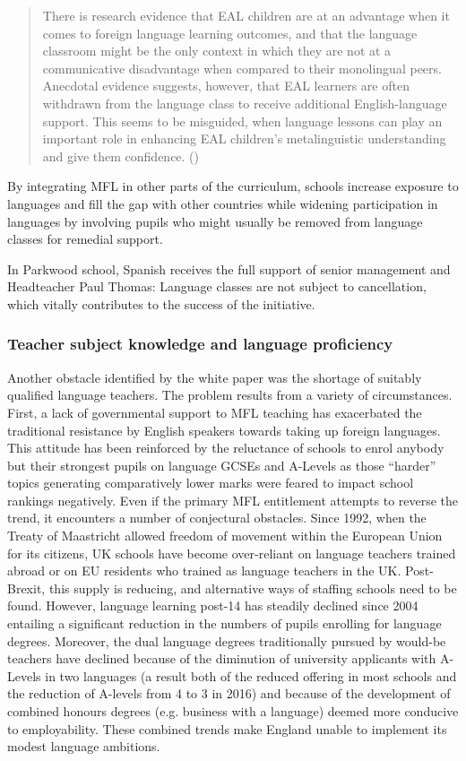 \documentclass[output=paper]{langscibook}
\begin{document}
\begin{quote}
There is research evidence that EAL children are at an advantage when it comes to foreign language learning outcomes, and that the language classroom might be the only context in which they are not at a communicative disadvantage when compared to their monolingual peers. Anecdotal evidence suggests, however, that EAL learners are often withdrawn from the language class to receive additional English-language support. This seems to be misguided, when language lessons can play an important role in enhancing EAL children’s metalinguistic understanding and give them confidence. (\citealt[11--12]{HolmesMyles2019})
\end{quote}

By integrating MFL in other parts of the curriculum, schools increase exposure to languages and fill the gap with other countries while widening participation in languages by involving pupils who might usually be removed from language classes for remedial support.

In Parkwood school, Spanish receives the full support of senior management and Headteacher Paul Thomas: Language classes are not subject to cancellation, which vitally contributes to the success of the initiative.

\subsubsection{Teacher subject knowledge and language proficiency}

Another obstacle identified by the white paper was the shortage of suitably qualified language teachers. The problem results from a variety of circumstances. First, a lack of governmental support to MFL teaching has exacerbated the traditional resistance by English speakers towards taking up foreign languages. This attitude has been reinforced by the reluctance of schools to enrol anybody but their strongest pupils on language GCSEs and A-Levels as those ``harder'' topics generating comparatively lower marks were feared to impact school rankings negatively. Even if the primary MFL entitlement attempts to reverse the trend, it encounters a number of conjectural obstacles. {Since 1992}, when the Treaty of Maastricht allowed freedom of movement within the European Union for its citizens, UK schools have become over-reliant on language teachers trained abroad or on EU residents who trained as language teachers in the UK. Post-Brexit, this supply is reducing, and alternative ways of staffing schools need to be found. However, language learning post-14 has steadily declined since 2004 entailing a significant reduction in the numbers of pupils enrolling for language degrees. Moreover, the dual language degrees traditionally pursued by would-be teachers have declined because of the diminution of university applicants with A-Levels in two languages (a result both of the reduced offering in most schools and the reduction of A-levels from 4 to 3 in 2016) and because of the development of combined honours degrees (e.g. business with a language) deemed more conducive to employability. These combined trends make England unable to implement its modest language ambitions.
\end{document}
